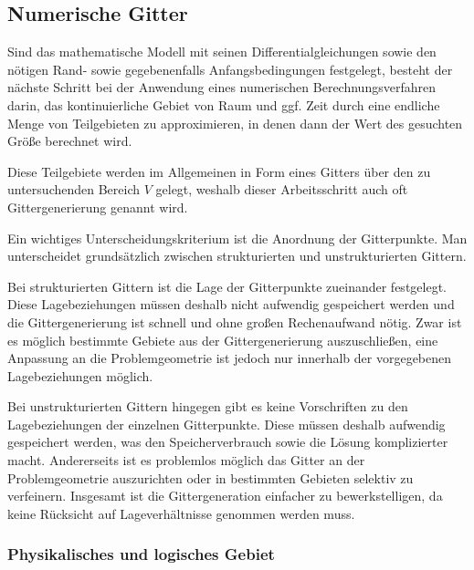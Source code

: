 \subsection{Numerische Gitter}
\label{sec:num_gitter}

Sind das mathematische Modell mit seinen Differentialgleichungen sowie den nötigen
Rand- sowie gegebenenfalls Anfangsbedingungen festgelegt, besteht der nächste Schritt
bei der Anwendung eines numerischen Berechnungsverfahren darin, das kontinuierliche
Gebiet von Raum und ggf. Zeit durch eine endliche Menge von Teilgebieten zu approximieren,
in denen dann der Wert des gesuchten Größe berechnet wird.

Diese Teilgebiete werden im Allgemeinen in Form eines Gitters über den zu untersuchenden
Bereich $V$ gelegt, weshalb dieser Arbeitsschritt auch oft Gittergenerierung genannt wird.

Ein wichtiges Unterscheidungskriterium ist die Anordnung der Gitterpunkte.
Man unterscheidet grundsätzlich zwischen strukturierten und unstrukturierten Gittern.

Bei strukturierten Gittern ist die Lage der Gitterpunkte zueinander festgelegt. Diese
Lagebeziehungen müssen deshalb nicht aufwendig gespeichert werden und die Gittergenerierung
ist schnell und ohne großen Rechenaufwand nötig. Zwar ist es möglich bestimmte Gebiete
aus der Gittergenerierung auszuschließen, eine Anpassung an die Problemgeometrie ist
jedoch nur innerhalb der vorgegebenen Lagebeziehungen möglich.

Bei unstrukturierten Gittern hingegen gibt es keine Vorschriften zu den Lagebeziehungen
der einzelnen Gitterpunkte. Diese müssen deshalb aufwendig gespeichert werden, was
den Speicherverbrauch sowie die Lösung komplizierter macht. Andererseits ist es problemlos möglich
das Gitter an der Problemgeometrie auszurichten oder in bestimmten Gebieten selektiv zu verfeinern.
Insgesamt ist die Gittergeneration einfacher zu bewerkstelligen, da keine Rücksicht auf Lageverhältnisse
genommen werden muss.

\subsubsection{Physikalisches und logisches Gebiet}

